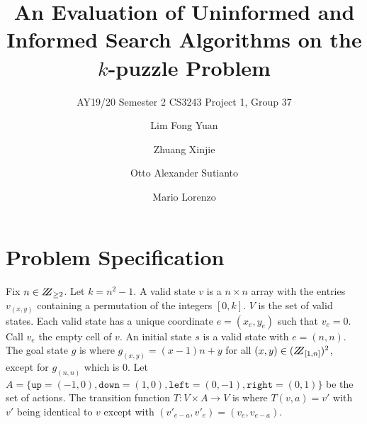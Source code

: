 \documentclass[runningheads]{llncs}
\begin{document}
%
\title{An Evaluation of Uninformed and Informed Search Algorithms on the $k$-puzzle Problem}
\subtitle{AY19/20 Semester 2 CS3243 Project 1, Group 37}
%
%
\author{Lim Fong Yuan \and
Zhuang Xinjie \and
Otto Alexander Sutianto \and
Mario Lorenzo}
%
%
%
\maketitle              %
%

%
%
%
\section{Problem Specification}

Fix $n \in \bbbz_{\geq 2}$. Let $k = n^2 -1$.
A valid state $v$ is a $n \times n$ array with the entries $v_{(x,y)}$ containing a permutation of the integers $[0,k]$. $V$ is the set of valid states.
Each valid state has a unique coordinate $e = (x_e,y_e)$ such that $v_e = 0$. Call $v_e$ the empty cell of $v$.
An initial state $s$ is a valid state with $e = (n,n)$.
The goal state $g$ is where $g_{(x,y)} = (x-1)n+y$ for all $(x,y) \in (\bbbz_{[1,n]})^2$, except for $g_{(n,n)}$ which is $0$.
Let $A = \{\texttt{up}=(-1,0),\texttt{down}=(1,0),\texttt{left}=(0,-1),\texttt{right}=(0,1)\}$ be the set of actions.
The transition function $T: V \times A \to V$ is where $T(v,a) = v'$ with $v'$ being identical to $v$ except with $(v'_{e-a},v'_e) = (v_e,v_{e-a})$.%
\end{document}
